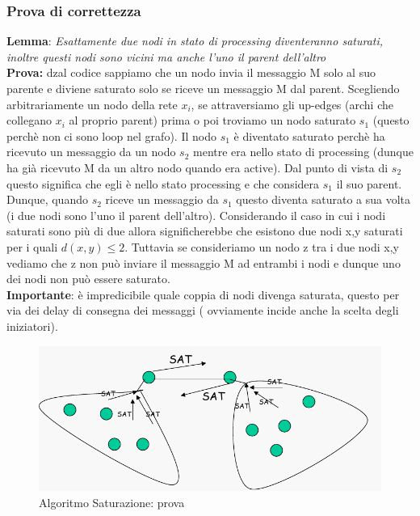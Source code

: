 \documentclass[12pt]{article}
\begin{document}
		\subsubsection{Prova di correttezza}
			\textbf{Lemma}: \textit{Esattamente due nodi in stato di processing diventeranno saturati, inoltre questi nodi sono vicini ma anche l'uno il parent dell'altro}\\
			
			\textbf{Prova:} dzal codice sappiamo che un nodo invia il messaggio M solo al suo parente e diviene saturato solo se riceve un messaggio M dal parent. Scegliendo arbitrariamente un nodo della rete $x_{i}$, se attraversiamo gli up-edges (archi che collegano $x_{i}$ al proprio parent) prima o poi troviamo un nodo saturato $s_1$ (questo perchè non ci sono loop nel grafo). Il nodo $s_1$ è diventato saturato perchè ha ricevuto un messaggio da un nodo $s_2$ mentre era nello stato di processing (dunque ha già ricevuto M da un altro nodo quando era active). Dal punto di vista di $s_2$ questo significa che egli è nello stato processing e che considera $s_1$ il suo parent. Dunque, quando $s_2$ riceve un messaggio da $s_1$ questo diventa saturato a sua volta (i due nodi sono l'uno il parent dell'altro). Considerando il caso in cui i nodi saturati sono più di due allora significherebbe che esistono due nodi x,y  saturati per i quali $d(x,y)\leq 2$. Tuttavia se consideriamo un nodo z tra i due nodi x,y vediamo che z non può inviare il messaggio M ad entrambi i nodi e dunque uno dei nodi non può essere saturato. \\
			
			\textbf{Importante}: è impredicibile quale coppia di nodi divenga saturata, questo per via dei delay di consegna dei messaggi ( ovviamente incide anche la scelta degli iniziatori).
			\begin{figure}[h!]
				\centering
				\includegraphics[scale=0.3]{img/satprov.png}
				\caption{Algoritmo Saturazione: prova}
			\end{figure}
		
\end{document}
